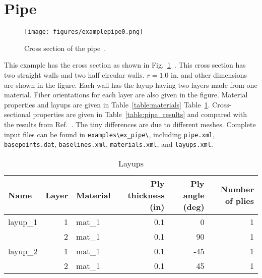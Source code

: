\documentclass{book}
\begin{document}
\clearpage
\section{Pipe}
\label{eg:pipe}

\begin{figure}[h]
  \centerline{\texttt{[image: figures/examplepipe0.png]}}
  \caption{Cross section of the pipe~\cite{yu2005}.}
  \label{fig:pipe_draw}
\end{figure}

This example has the cross section as shown in Fig.~\ref{fig:pipe_draw}~\cite{yu2005}. 
This cross section has two straight walls and two half circular walls. 
$r=1.0$ in. and other dimensions are shown in the figure. Each wall has 
the layup having two layers made from one material. Fiber orientations 
for each layer are also given in the figure. Material properties and 
layups are given in Table~\ref{table:materials} Table~\ref{table:pipe_layups}. 
Cross-sectional properties are given in Table~\ref{table:pipe_results} 
and compared with the results from Ref.~. The tiny 
differences are due to different meshes. Complete input files can be 
found in \verb|examples\ex_pipe\|, including \verb|pipe.xml|, \verb|basepoints.dat|, 
\verb|baselines.xml|, \verb|materials.xml|, and \verb|layups.xml|.

\begin{table}[h]
  \centering
  \caption{Layups}
  \begin{tabular}{lrlrrr}
    \toprule
    Name & Layer & Material & Ply thickness (in) & Ply angle (deg) & Number of plies \\
    \midrule
    layup\_1 & 1 & mat\_1 & 0.1 &   0 & 1 \\
             & 2 & mat\_1 & 0.1 &  90 & 1 \\
    layup\_2 & 1 & mat\_1 & 0.1 & -45 & 1 \\
             & 2 & mat\_1 & 0.1 &  45 & 1 \\
    \bottomrule
  \end{tabular}
  \label{table:pipe_layups}
\end{table}
\end{document}
